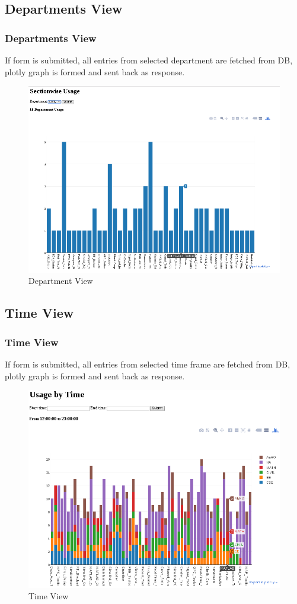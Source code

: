 \documentclass{beamer}
\begin{document}
\subsection{Departments View}
\begin{frame}
    \frametitle{Departments View}
    If form is submitted, all entries from selected department are fetched from DB, plotly graph is formed and sent back as response.
    \begin{figure}
        \includegraphics[scale=0.35]{departmentview}
        \caption{Department View}
    \end{figure}
\end{frame}

\subsection{Time View}
\begin{frame}
    \frametitle{Time View}
    If form is submitted, all entries from selected time frame are fetched from DB, plotly graph is formed and sent back as response.
    \begin{figure}
        \includegraphics[scale=0.35]{timeview}
        \caption{Time View}
    \end{figure}
\end{frame}
\end{document}
